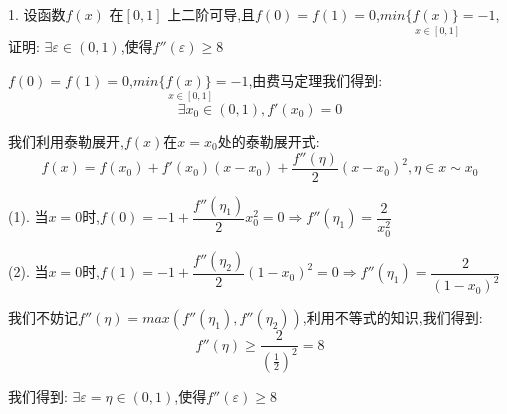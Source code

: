 1. 设函数$f(x)$ 在$[0,1]$ 上二阶可导,且$f(0)=f(1)=0$,$\underset{x\in [0,1]}{min \{f(x)\}=-1}$,证明: $\exists \varepsilon \in(0,1)$,使得$f''(\varepsilon)\geq 8$
\begin{solution}
	
	$f(0)=f(1)=0$,$\underset{x\in [0,1]}{min \{f(x)\}=-1}$,由费马定理我们得到: 
	$$\exists x_{0}\in(0,1),f'(x_{0})=0$$
	
	我们利用泰勒展开,$f(x)$在$x=x_{0}$处的泰勒展开式: 
	$$f(x)=f(x_{0})+f'(x_{0})(x-x_{0})+\frac{f''(\eta)}{2}(x-x_{0})^2,\eta \in x\sim x_{0} $$
	
	(1). 当$x=0$时,$f(0)=-1+\dfrac{f''(\eta_{1})}{2}x_{0}^2=0\Rightarrow f''(\eta_{1})=\dfrac{2}{x_{0}^2}$
	
	(2). 当$x=0$时,$f(1)=-1+\dfrac{f''(\eta_{2})}{2}(1-x_{0})^2=0\Rightarrow f''(\eta_{1})=\dfrac{2}{(1-x_{0})^2}$
	
	我们不妨记$f''(\eta)=max(f''(\eta_{1}),f''(\eta_{2}))$,利用不等式的知识,我们得到: 
	$$f''(\eta)\geq \frac{2}{(\frac{1}{2})^2}=8$$
	
	我们得到: $\exists \varepsilon=\eta \in(0,1)$,使得$f''(\varepsilon)\geq 8$
\end{solution}

